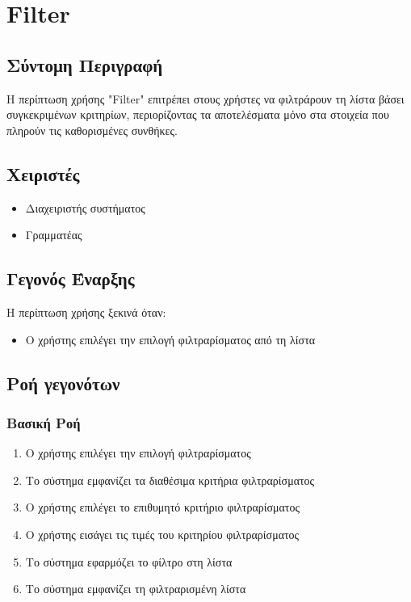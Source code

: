 \documentclass[12pt,a4paper,twoside]{book}
\begin{document}
\section{Filter}

\subsection{Σύντομη Περιγραφή}
Η περίπτωση χρήσης "Filter" επιτρέπει στους χρήστες να φιλτράρουν τη λίστα βάσει συγκεκριμένων κριτηρίων, περιορίζοντας τα αποτελέσματα μόνο στα στοιχεία που πληρούν τις καθορισμένες συνθήκες. %

\subsection{Χειριστές}
\begin{itemize}
  \item Διαχειριστής συστήματος
  \item Γραμματέας
\end{itemize}

\subsection{Γεγονός Έναρξης}
Η περίπτωση χρήσης ξεκινά όταν:
\begin{itemize}
  \item Ο χρήστης επιλέγει την επιλογή φιλτραρίσματος από τη λίστα %
\end{itemize}

\subsection{Ροή γεγονότων}

\subsubsection{Βασική Ροή}
\begin{enumerate}
  \item Ο χρήστης επιλέγει την επιλογή φιλτραρίσματος
  \item Το σύστημα εμφανίζει τα διαθέσιμα κριτήρια φιλτραρίσματος%
  \item Ο χρήστης επιλέγει το επιθυμητό κριτήριο φιλτραρίσματος
  \item Ο χρήστης εισάγει τις τιμές του κριτηρίου φιλτραρίσματος
  \item Το σύστημα εφαρμόζει το φίλτρο στη λίστα
  \item Το σύστημα εμφανίζει τη φιλτραρισμένη λίστα
\end{enumerate}
\end{document}
